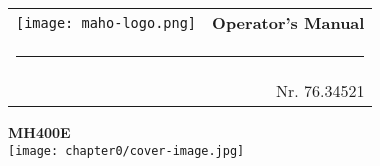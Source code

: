 
\thispagestyle{coverpage}

\begin{titlepage}
    \thispagestyle{coverpage}

    \vspace*{0cm}

    {\sffamily

        \noindent
        \begin{tabularx}{\textwidth}{X r}
            \texttt{[image: maho-logo.png]} &
            {\Huge \textbf{Operator's Manual}} \\
            \multicolumn{2}{l}{\rule{\textwidth}{0.4mm}} \\
            & {\normalsize Nr. 76.34521}
        \end{tabularx}

        \centering
        \vspace{2cm}

        {\fontsize{60pt}{62pt} \bfseries MH400E}\\[1cm]

        \texttt{[image: chapter0/cover-image.jpg]} 

        \vfill

         \noindent
         \begin{center}
             \parbox{\textwidth}{}
         \end{center}
    }
\end{titlepage}

\clearpage %
\pagestyle{fancy} %